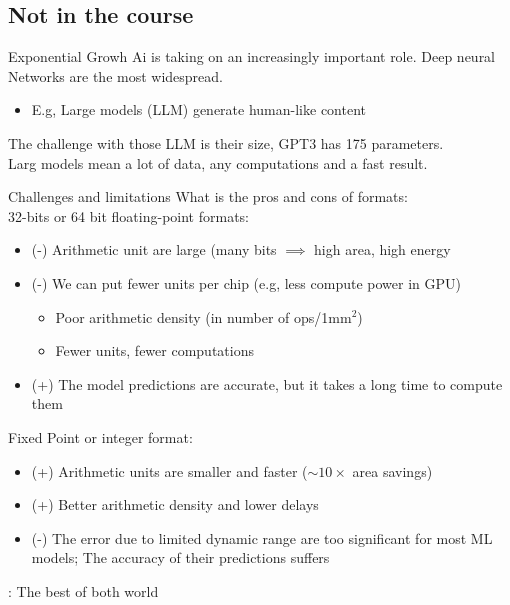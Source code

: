 
\subsection{Not in the course}
\begin{parag}{Exponential Growh}
Ai is taking on an increasingly important role. Deep neural Networks are the most widespread.
\begin{itemize}
    \item E.g, Large models (LLM) generate human-like content
\end{itemize}
The challenge with those LLM is their size, GPT3 has 175  parameters.\\
Larg models mean a lot of data, any computations and a fast result.
\end{parag}
\begin{parag}{Challenges and limitations}
    What is the pros and cons of formats:
    \\
    32-bits or 64 bit floating-point formats:
    \begin{itemize}
        \item (-) Arithmetic unit are large (many bits $ \implies$ high area, high energy
        \item (-) We can put fewer units per chip (e.g, less compute power in GPU)
           \begin{itemize}
               \item Poor arithmetic density (in number of ops/1mm$^2$)
               \item Fewer units, fewer computations
           \end{itemize}
       \item (+) The model predictions are accurate, but it takes a long time to compute them
    \end{itemize}
    Fixed Point or integer format:
    \begin{itemize}
        \item (+) Arithmetic units are smaller and faster ($\sim 10 \times$ area savings)
        \item (+) Better arithmetic density and lower delays
        \item (-) The error due to limited dynamic range are too significant for most ML models; The accuracy of their predictions suffers
    \end{itemize}
: The best of both world
\end{parag}

